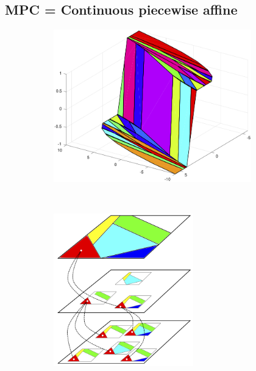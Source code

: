 \documentclass[
  letterpaper,
  DIV=11,
  numbers=noendperiod,
  oneside]{scrartcl}
\begin{document}
\subsection{MPC = Continuous piecewise
affine}\label{mpc-continuous-piecewise-affine}

\begin{figure}

\begin{minipage}{0.46\linewidth}

\begin{figure}[H]

{\centering \includegraphics[width=\textwidth,height=2.60417in]{figs/mpc_surface.png}

}


\end{figure}%

\end{minipage}%
%
\begin{minipage}{0.09\linewidth}

🤝

\end{minipage}%
%
\begin{minipage}{0.46\linewidth}

\begin{figure}[H]

{\centering \includegraphics[width=\textwidth,height=2.60417in]{figs/relu_surface.png}

}


\end{figure}%

\end{minipage}%

\end{figure}%
\end{document}
